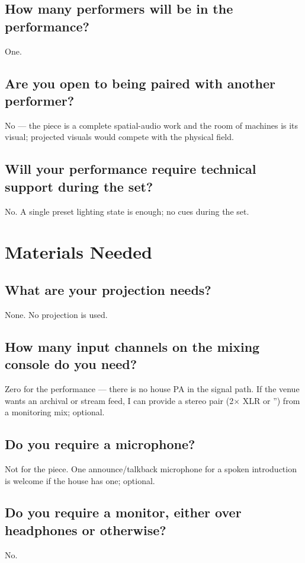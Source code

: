 \documentclass[10pt,letterpaper]{article}
\begin{document}
\subsection{How many performers will be in the performance?}
One.

\subsection{Are you open to being paired with another performer?}
No --- the piece is a complete spatial-audio work and the room of machines
is its visual; projected visuals would compete with the physical field.

\subsection{Will your performance require technical support during the set?}
No. A single preset lighting state is enough; no cues during the set.

\section{Materials Needed}

\subsection{What are your projection needs?}
None. No projection is used.

\subsection{How many input channels on the mixing console do you need?}
Zero for the performance --- there is no house PA in the signal path. If the
venue wants an archival or stream feed, I can provide a stereo pair
(2$\times$ XLR or \textonequarter{}'') from a monitoring mix; optional.

\subsection{Do you require a microphone?}
Not for the piece. One announce/talkback microphone for a spoken
introduction is welcome if the house has one; optional.

\subsection{Do you require a monitor, either over headphones or otherwise?}
No.
\end{document}
